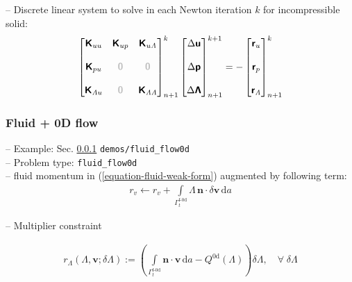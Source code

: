 \documentclass[a4paper,12pt]{report}
\newcommand{\fF}{\text{f}}
\newcommand{\bs}[1]{\boldsymbol{#1}}
\newcommand{\Gm}{\mathit{\Gamma}}
\newcommand{\zerom}{\textcolor{lightgray}{\bs{\mathsf{0}}}}
\newcommand{\ROP}{\bs{\mathsf{r}}}
\newcommand{\LMZ}{\bs{\mathsf{\Lambda}}}
\newcommand{\lmzi}{\mathit{\Lambda}} %
\begin{document}
-- Discrete linear system to solve in each Newton iteration $k$ for incompressible solid:
\begin{equation}
\label{equation-lin-sys-solid-inc-0d}
\begin{aligned}
\begin{bmatrix} \bs{\mathsf{K}}_{uu} & \bs{\mathsf{K}}_{up} & \bs{\mathsf{K}}_{u\lmzi} \\ \\ \bs{\mathsf{K}}_{pu} & \zerom & \zerom \\ \\  \bs{\mathsf{K}}_{\lmzi u} & \zerom & \bs{\mathsf{K}}_{\lmzi\lmzi}\end{bmatrix}_{n+1}^{k}\begin{bmatrix} \Delta\bs{\mathsf{u}} \\ \\ \Delta\bs{\mathsf{p}} \\ \\ \Delta\LMZ \end{bmatrix}_{n+1}^{k+1}=-\begin{bmatrix} \ROP_{u} \\ \\ \ROP_{p} \\ \\ \ROP_{\lmzi}\end{bmatrix}_{n+1}^{k}
\end{aligned}
\end{equation}

\subsubsection{Fluid + 0D flow}\label{fluid-0d-flow}

-- Example: Sec. \ref{fluid-0d-flow} \verb"demos/fluid_flow0d"\\

-- Problem type: \verb.fluid_flow0d.\\

-- fluid momentum in (\ref{equation-fluid-weak-form}) augmented by following term:
\begin{equation}
\begin{aligned}
r_v \leftarrow r_v + \int\limits_{\Gm_t^{\fF\text{-}\mathrm{0d}}}\!\mathit{\Lambda}\,\bs{n}\cdot\delta\bs{v}\,\mathrm{d}a
\end{aligned}
\end{equation}

-- Multiplier constraint

\begin{equation}
\begin{aligned}
r_{\mathit{\Lambda}}(\mathit{\Lambda},\bs{v};\delta\mathit{\Lambda}):= \left(\int\limits_{\Gm_t^{\mathrm{\fF\text{-}0d}}}\! \bs{n}\cdot\bs{v}\,\mathrm{d}a - Q^{\mathrm{0d}}(\mathit{\Lambda})\right) \delta\mathit{\Lambda}, \quad \forall \; \delta\mathit{\Lambda}
\end{aligned}
\end{equation}
\end{document}

